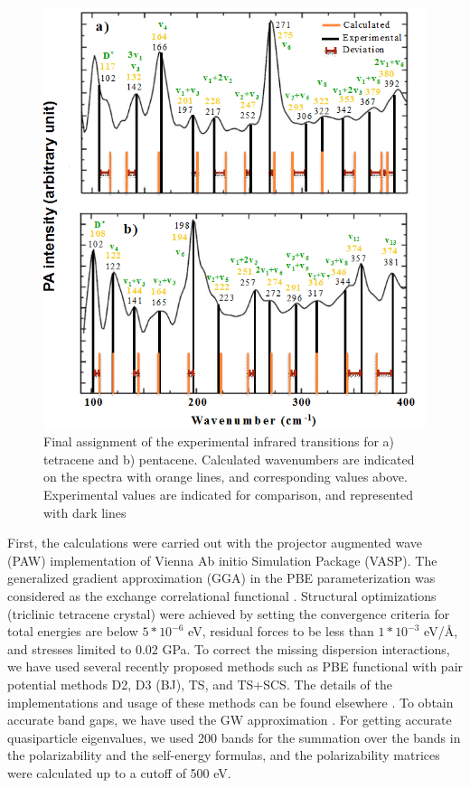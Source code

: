  \begin{figure}[H]
 	\centering
 	\includegraphics[scale=0.8]{image/final-exp}
 	\caption[Final assignment of the experimental infrared transitions for tetracene and pentacene]{Final assignment of the experimental infrared transitions for a) tetracene and b) pentacene. Calculated wavenumbers are indicated on the spectra with orange lines, and corresponding values above. Experimental values are indicated for comparison, and represented with dark lines} \label{figure9}
 \end{figure}

First, the calculations were carried out with the projector augmented wave (PAW) implementation of Vienna Ab initio Simulation Package (VASP)\cite{kresse1996efficient}. The generalized gradient approximation (GGA) in the PBE parameterization was considered as the exchange correlational functional \cite{perdew1996generalized}. Structural optimizations (triclinic tetracene crystal) were achieved by setting the convergence criteria for total energies are below $5*10^{-6}$ eV, residual forces to be less than $1*10^{-3}$ eV/Å, and stresses limited to 0.02 GPa. To correct the missing dispersion interactions, we have used several recently proposed methods such as PBE functional with pair potential methods D2, D3 (BJ), TS, and TS+SCS. The details of the implementations and usage of these methods can be found elsewhere \cite{grimme2006semiempirical,grimme2011effect,tkatchenko2009accurate,tkatchenko2012accurate,dion2004van}. To obtain accurate band gaps, we have used the GW approximation \cite{bowman2008variational}.  For getting accurate quasiparticle eigenvalues, we used 200 bands for the summation over the bands in the polarizability and the self-energy formulas, and the polarizability matrices were calculated up to a cutoff  of 500 eV.\\ 

